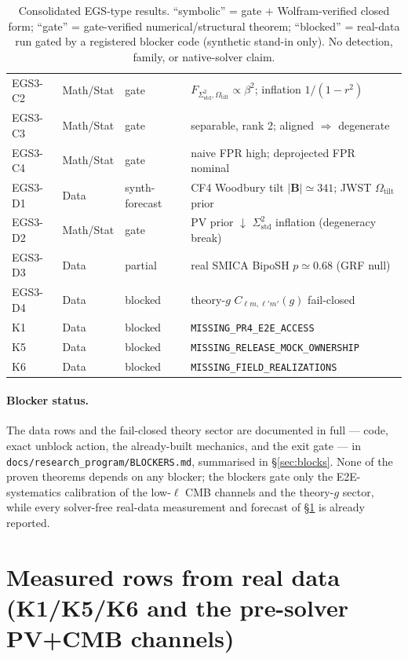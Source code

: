 \documentclass[11pt,a4paper]{article}
\newcommand{\Sigstd}{\Sigma^{2}_{\mathrm{std}}}
\newcommand{\Otilt}{\Omega_{\mathrm{tilt}}}
\theoremstyle{plain}
\theoremstyle{definition}
\begin{document}
\begin{table}[htbp]
\begin{tabular}{@{}llll@{}}
    EGS3-C2 & Math/Stat & gate & $F_{\Sigstd,\Otilt}\propto\beta^2$; inflation $1/(1{-}r^2)$ \\
    EGS3-C3 & Math/Stat & gate & separable, rank 2; aligned $\Rightarrow$ degenerate \\
    EGS3-C4 & Math/Stat & gate & naive FPR high; deprojected FPR nominal \\
    EGS3-D1 & Data & synth-forecast & CF4 Woodbury tilt $|\mathbf B|{\simeq}341$; JWST $\Otilt$ prior \\
    EGS3-D2 & Math/Stat & gate & PV prior $\downarrow$ $\Sigstd$ inflation (degeneracy break) \\
    EGS3-D3 & Data & partial & real SMICA BipoSH $p{\simeq}0.68$ (GRF null) \\
    EGS3-D4 & Data & blocked & theory-$g$ $C_{\ell m,\ell'm'}(g)$ fail-closed \\
    K1 & Data & blocked & \texttt{MISSING\_PR4\_E2E\_ACCESS} \\
    K5 & Data & blocked & \texttt{MISSING\_RELEASE\_MOCK\_OWNERSHIP} \\
    K6 & Data & blocked & \texttt{MISSING\_FIELD\_REALIZATIONS} \\
    \bottomrule
  \end{tabular}
  \caption{Consolidated EGS-type results. ``symbolic'' = gate $+$
    Wolfram-verified closed form; ``gate'' = gate-verified
    numerical/structural theorem; ``blocked'' = real-data run gated by a
    registered blocker code (synthetic stand-in only). No detection, family, or
    native-solver claim.}
  \label{tab:egs-consolidated}
\end{table}

\paragraph{Blocker status.}
The data rows and the fail-closed theory sector are documented in full --- code,
exact unblock action, the already-built mechanics, and the exit gate --- in
\texttt{docs/research\_program/BLOCKERS.md}, summarised in \S\ref{sec:blocks}.
None of the proven theorems depends on any blocker; the blockers gate only the
E2E-systematics calibration of the low-$\ell$ CMB channels and the theory-$g$
sector, while every solver-free real-data measurement and forecast of
\S\ref{sec:measured} is already reported.

\section{Measured rows from real data (K1/K5/K6 and the pre-solver PV+CMB channels)}
\label{sec:measured}
\end{document}
